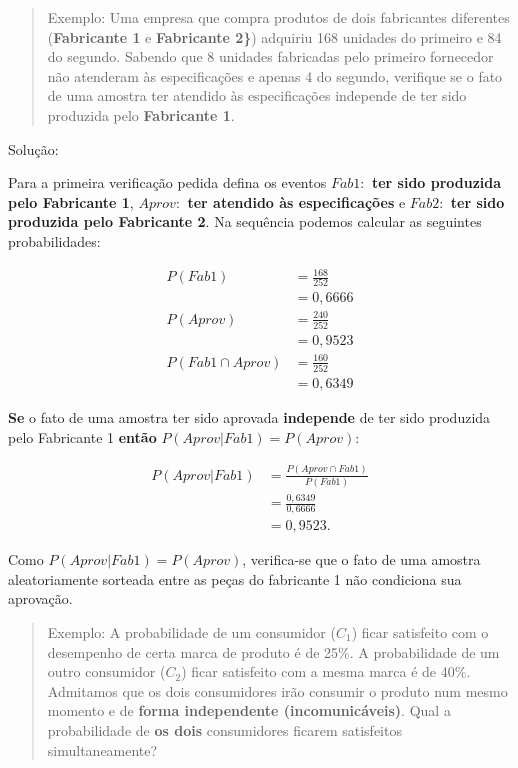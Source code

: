\documentclass[
]{book}
\begin{document}
\hfill\break

\begin{quote}
Exemplo: Uma empresa que compra produtos de dois fabricantes diferentes (\textbf{Fabricante 1} e \textbf{Fabricante 2\}}) adquiriu 168 unidades do primeiro e 84 do segundo. Sabendo que 8 unidades fabricadas pelo primeiro fornecedor não atenderam às especificações e apenas 4 do segundo, verifique se o fato de uma amostra ter atendido às especificações independe de ter sido produzida pelo \textbf{Fabricante 1}.
\end{quote}

\hfill\break

Solução:

Para a primeira verificação pedida defina os eventos \textbf{\(Fab1:\) ter sido produzida pelo Fabricante 1}, \textbf{\(Aprov:\) ter atendido às especificações} e \textbf{\(Fab2:\) ter sido produzida pelo Fabricante 2}. Na sequência podemos calcular as seguintes probabilidades:

\begin{align*}
P(Fab1)   & = \frac{168}{252} \\
          & = 0,6666 \\
P(Aprov)  & = \frac{240}{252} \\
          & = 0,9523 \\
P(Fab1 \cap Aprov) & = \frac{160}{252} \\
          & =  0,6349  
\end{align*}

\textbf{Se} o fato de uma amostra ter sido aprovada \textbf{independe} de ter sido produzida pelo Fabricante 1 \textbf{então} \(P(Aprov|Fab1) = P(Aprov)\):

\begin{align*}
P(Aprov|Fab1) & = \frac{P(Aprov \cap Fab1)}{P(Fab1)} \\
              & = \frac{0,6349}{0,6666} \\
              & =  0,9523.
\end{align*}

Como \(P(Aprov|Fab1) = P(Aprov)\), verifica-se que o fato de uma amostra aleatoriamente sorteada entre as peças do fabricante 1 não condiciona sua aprovação.

\hfill\break

\begin{quote}
Exemplo: A probabilidade de um consumidor (\(C_{1}\)) ficar satisfeito com o desempenho de certa marca de produto é de 25\%. A probabilidade de um outro consumidor (\(C_{2}\)) ficar satisfeito com a mesma marca é de 40\%. Admitamos que os dois consumidores irão consumir o produto num mesmo momento e de \textbf{forma independente (incomunicáveis)}. Qual a probabilidade de \textbf{os dois} consumidores ficarem satisfeitos simultaneamente?
\end{quote}
\end{document}
